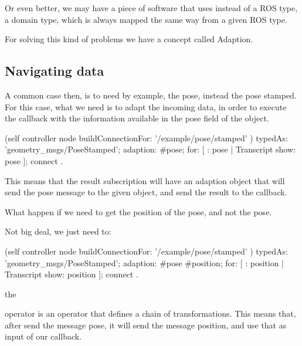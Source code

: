 \documentclass[a4paper,10pt,twoside]{book}
\begin{document}
						Or even better, we may have a piece of software that uses instead of a ROS type, a domain type, which is always mapped the same way from a given ROS type.
						
						For solving this kind of problems we have a concept called Adaption.



						\subsection{Navigating data}
						
							A common case then, is to need by example, the pose, instead the pose stamped. For this case, what we need is to adapt the incoming data, in order to execute the callback with the information available in the pose field of the object.
							
							\begin{code}
				(self controller node buildConnectionFor: '/example/pose/stamped' ) 
					typedAs: 'geometry_msgs/PoseStamped'; 
					adaption: #pose;
					for: [ : pose |  Transcript show: pose ];
					connect .
					
							\end{code}
							
							This means that the result subscription will have an adaption object that will send the pose message to the given object, and send the result to the callback.
							
							What happen if we need to get the position of the pose, and not the pose. 
							
							Not big deal, we just need to: 
							
							\begin{code}
				(self controller node buildConnectionFor: '/example/pose/stamped' ) 
					typedAs: 'geometry_msgs/PoseStamped'; 
					adaption: #pose \> #position;
					for: [ : position |  Transcript show: position ];
					connect .
					
							\end{code}
							
							the 
							
							\begin{code} 
							
							\> 
							
							\end{code} 
							
							operator is an operator that defines a chain of transformations. This means that, after send the message pose, it will send the message position, and use that as input of our callback. 
							
\end{document}
